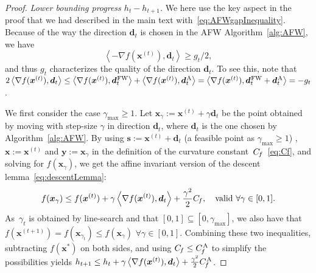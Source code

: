 \documentclass{article} %
\newcommand{\stepsize}{\gamma}
\newcommand{\FW}{{\hspace{0.05em}\textnormal{FW}}}
\newcommand{\away}{{\hspace{0.06em}\textnormal{\scriptsize A}}}
\newcommand{\Cf}{C_{\hspace{-0.08em}f}}
\newcommand{\CfAFW}{C_{\hspace{-0.08em}f}^\away}
\newcommand{\x}{\bm{x}}
\newcommand{\y}{\bm{y}}
\newcommand{\s}{\bm{s}}
\newcommand{\dd}{\bm{d}}
\newcommand{\0}{\mathbf{0}} %
\begin{document}
\begin{proof}
\emph{Lower bounding progress $h_t-h_{t+1}$.} We here use
the key aspect in the proof that we had described in the main text with~\eqref{eq:AFWgapInequality}.
Because of the way the direction $\dd_t$ is chosen in the AFW
Algorithm~\ref{alg:AFW}, we have 
\begin{equation} \label{eq:gapDirection}
	\left\langle  -\nabla f(\x^{(t)}), \dd_t \right\rangle \geq g_t/2 , %
\end{equation}
and thus $g_t$ characterizes the quality of the direction $\dd_t$. To see
this, note that $2 \left\langle  \nabla f(\x^{(t)}), \dd_t \right\rangle \leq
 \left\langle \nabla f(\x^{(t)}), \dd_t^\FW\right\rangle  + \left\langle
\nabla f(\x^{(t)}), \dd_t^\away\right\rangle = \left\langle \nabla
f(\x^{(t)}), \dd_t^\FW+\dd_t^\away\right\rangle = -g_t$.

We first consider the case $\stepsize_\textrm{max} \geq 1$. Let $\x_\stepsize
:=  \x^{(t)} + \stepsize \dd_t$ be the point obtained by moving with
step-size $\stepsize$ in direction $\dd_t$, where $\dd_t$ is the one chosen
by Algorithm~\ref{alg:AFW}. By using $\s := \x^{(t)} + \dd_t$ (a feasible
point as $\stepsize_\textrm{max} \geq 1$)%
, $\x := \x^{(t)}$ and $\y := \x_\stepsize$ in the definition of the
curvature constant~$\Cf$~\eqref{eq:Cf}, and solving for $f(\x_\stepsize)$, we
get the affine invariant version of the descent lemma~\eqref{eq:descentLemma}:
\begin{equation} \label{eq:descentLemmaCf}
f(\x_\stepsize) \leq f(\x^{(t)}) + \stepsize \left\langle  \nabla
f(\x^{(t)}), \dd_t \right\rangle + \frac{\stepsize^2}{2} \Cf, \quad \text{valid $\forall
\stepsize \in [0,1]$}.
\end{equation}
As~$\stepsize_t$ is obtained by line-search and that
$[0,1] \subseteq [0,\stepsize_\textrm{max}]$, we also have that
$f(\x^{(t+1)}) = f(\x_{\stepsize_t}) \leq  f(\x_\stepsize)$ $\forall
\stepsize \in [0,1]$. Combining these two inequalities, subtracting $f(\x^*)$
on both sides, and using $\Cf \leq \CfAFW$ to simplify the possibilities
yields $h_{t+1} \le h_t + \stepsize \left\langle  \nabla f(\x^{(t)}), \dd_t
\right\rangle + \frac{\stepsize^2}{2} \CfAFW$.


\end{proof}
\end{document}
